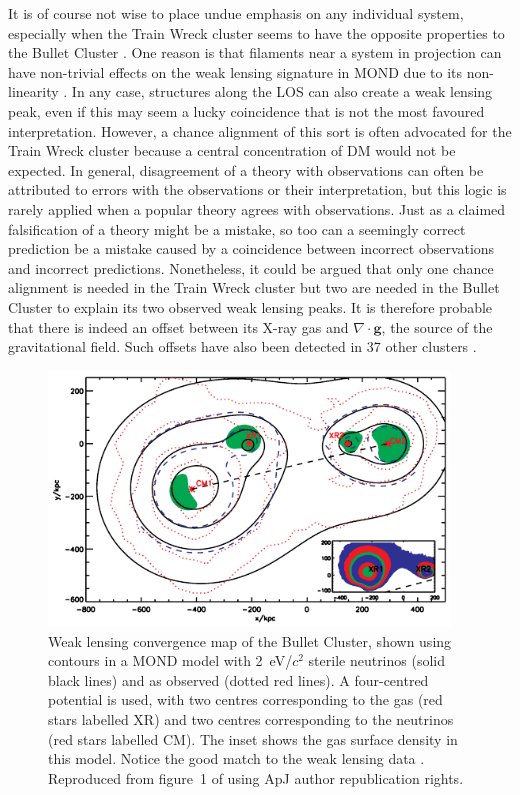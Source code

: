 \documentclass[fleqn,usenatbib,useAMS,onecolumn]{mnras} %
\begin{document}
It is of course not wise to place undue emphasis on any individual system, especially when the Train Wreck cluster seems to have the opposite properties to the Bullet Cluster \citep[as briefly reviewed in][]{Deshev_2017}. One reason is that filaments near a system in projection can have non-trivial effects on the weak lensing signature in MOND due to its non-linearity \citep{Feix_2008}. In any case, structures along the LOS can also create a weak lensing peak, even if this may seem a lucky coincidence that is not the most favoured interpretation. However, a chance alignment of this sort is often advocated for the Train Wreck cluster because a central concentration of DM would not be expected. In general, disagreement of a theory with observations can often be attributed to errors with the observations or their interpretation, but this logic is rarely applied when a popular theory agrees with observations. Just as a claimed falsification of a theory might be a mistake, so too can a seemingly correct prediction be a mistake caused by a coincidence between incorrect observations and incorrect predictions. Nonetheless, it could be argued that only one chance alignment is needed in the Train Wreck cluster but two are needed in the Bullet Cluster to explain its two observed weak lensing peaks. It is therefore probable that there is indeed an offset between its X-ray gas and $\nabla \cdot \bm{g}$, the source of the gravitational field. Such offsets have also been detected in 37 other clusters \citep{Shan_2010}.

\begin{figure}
	\centering
	\includegraphics[width=0.95\textwidth]{Angus_2007_Figure_1}
	\caption{Weak lensing convergence map of the Bullet Cluster, shown using contours in a MOND model with 2~eV/$c^2$ sterile neutrinos (solid black lines) and as observed (dotted red lines). A four-centred potential is used, with two centres corresponding to the gas (red stars labelled XR) and two centres corresponding to the neutrinos (red stars labelled CM). The inset shows the gas surface density in this model. Notice the good match to the weak lensing data \citep{Clowe_2006}. Reproduced from figure~1 of \citet{Angus_2007} using ApJ author republication rights.}
	\label{Angus_2007_Figure_1}
\end{figure}
\end{document}
